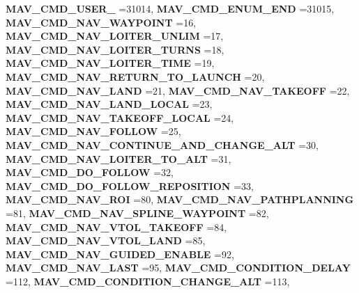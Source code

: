 \begin{DoxyCompactItemize}
\textbf{ M\+A\+V\+\_\+\+C\+M\+D\+\_\+\+U\+S\+E\+R\+\_} =31014, 
\newline
\textbf{ M\+A\+V\+\_\+\+C\+M\+D\+\_\+\+E\+N\+U\+M\+\_\+\+E\+ND} =31015, 
\textbf{ M\+A\+V\+\_\+\+C\+M\+D\+\_\+\+N\+A\+V\+\_\+\+W\+A\+Y\+P\+O\+I\+NT} =16, 
\textbf{ M\+A\+V\+\_\+\+C\+M\+D\+\_\+\+N\+A\+V\+\_\+\+L\+O\+I\+T\+E\+R\+\_\+\+U\+N\+L\+IM} =17, 
\textbf{ M\+A\+V\+\_\+\+C\+M\+D\+\_\+\+N\+A\+V\+\_\+\+L\+O\+I\+T\+E\+R\+\_\+\+T\+U\+R\+NS} =18, 
\newline
\textbf{ M\+A\+V\+\_\+\+C\+M\+D\+\_\+\+N\+A\+V\+\_\+\+L\+O\+I\+T\+E\+R\+\_\+\+T\+I\+ME} =19, 
\textbf{ M\+A\+V\+\_\+\+C\+M\+D\+\_\+\+N\+A\+V\+\_\+\+R\+E\+T\+U\+R\+N\+\_\+\+T\+O\+\_\+\+L\+A\+U\+N\+CH} =20, 
\textbf{ M\+A\+V\+\_\+\+C\+M\+D\+\_\+\+N\+A\+V\+\_\+\+L\+A\+ND} =21, 
\textbf{ M\+A\+V\+\_\+\+C\+M\+D\+\_\+\+N\+A\+V\+\_\+\+T\+A\+K\+E\+O\+FF} =22, 
\newline
\textbf{ M\+A\+V\+\_\+\+C\+M\+D\+\_\+\+N\+A\+V\+\_\+\+L\+A\+N\+D\+\_\+\+L\+O\+C\+AL} =23, 
\textbf{ M\+A\+V\+\_\+\+C\+M\+D\+\_\+\+N\+A\+V\+\_\+\+T\+A\+K\+E\+O\+F\+F\+\_\+\+L\+O\+C\+AL} =24, 
\textbf{ M\+A\+V\+\_\+\+C\+M\+D\+\_\+\+N\+A\+V\+\_\+\+F\+O\+L\+L\+OW} =25, 
\textbf{ M\+A\+V\+\_\+\+C\+M\+D\+\_\+\+N\+A\+V\+\_\+\+C\+O\+N\+T\+I\+N\+U\+E\+\_\+\+A\+N\+D\+\_\+\+C\+H\+A\+N\+G\+E\+\_\+\+A\+LT} =30, 
\newline
\textbf{ M\+A\+V\+\_\+\+C\+M\+D\+\_\+\+N\+A\+V\+\_\+\+L\+O\+I\+T\+E\+R\+\_\+\+T\+O\+\_\+\+A\+LT} =31, 
\textbf{ M\+A\+V\+\_\+\+C\+M\+D\+\_\+\+D\+O\+\_\+\+F\+O\+L\+L\+OW} =32, 
\textbf{ M\+A\+V\+\_\+\+C\+M\+D\+\_\+\+D\+O\+\_\+\+F\+O\+L\+L\+O\+W\+\_\+\+R\+E\+P\+O\+S\+I\+T\+I\+ON} =33, 
\textbf{ M\+A\+V\+\_\+\+C\+M\+D\+\_\+\+N\+A\+V\+\_\+\+R\+OI} =80, 
\newline
\textbf{ M\+A\+V\+\_\+\+C\+M\+D\+\_\+\+N\+A\+V\+\_\+\+P\+A\+T\+H\+P\+L\+A\+N\+N\+I\+NG} =81, 
\textbf{ M\+A\+V\+\_\+\+C\+M\+D\+\_\+\+N\+A\+V\+\_\+\+S\+P\+L\+I\+N\+E\+\_\+\+W\+A\+Y\+P\+O\+I\+NT} =82, 
\textbf{ M\+A\+V\+\_\+\+C\+M\+D\+\_\+\+N\+A\+V\+\_\+\+V\+T\+O\+L\+\_\+\+T\+A\+K\+E\+O\+FF} =84, 
\textbf{ M\+A\+V\+\_\+\+C\+M\+D\+\_\+\+N\+A\+V\+\_\+\+V\+T\+O\+L\+\_\+\+L\+A\+ND} =85, 
\newline
\textbf{ M\+A\+V\+\_\+\+C\+M\+D\+\_\+\+N\+A\+V\+\_\+\+G\+U\+I\+D\+E\+D\+\_\+\+E\+N\+A\+B\+LE} =92, 
\textbf{ M\+A\+V\+\_\+\+C\+M\+D\+\_\+\+N\+A\+V\+\_\+\+L\+A\+ST} =95, 
\textbf{ M\+A\+V\+\_\+\+C\+M\+D\+\_\+\+C\+O\+N\+D\+I\+T\+I\+O\+N\+\_\+\+D\+E\+L\+AY} =112, 
\textbf{ M\+A\+V\+\_\+\+C\+M\+D\+\_\+\+C\+O\+N\+D\+I\+T\+I\+O\+N\+\_\+\+C\+H\+A\+N\+G\+E\+\_\+\+A\+LT} =113, 
\newline

\end{DoxyCompactItemize}
